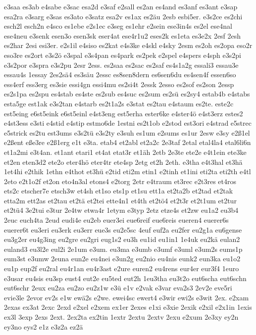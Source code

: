 {e3saa
es3ab
e4sabe
e3sac
esa2d
e3saf
e2sall
es2an
es4and
es3anf
es3ant
e3sap
esa2ra
e3sarg
e3sas
es3ato
e3satz
esa2v
es1ax
es2äu
2esb
esbi5er.
e3s2ce
es2chi
esch2l
esch2n
e4sco
es1ebe
e2s1ec
e3seg
es1ehr
e2sein
ese3in4s
es2el
ese4nal
ese4neu
e3senk
esen3o
esen3sk
eser4at
ese4r1u2
eses2k
es1eta
es3e2x
2esf
2esh
es2har
2esi
esi3er.
e2s1il
e4siso
es2kat
e4s3ke
e4skl
e4sky
2esm
es2oh
es2opa
eso2r
eso3re
es2ort
e3s2ö
e3spal
e3s4pan
es4park
es2pek
e2spel
e4spers
e4sph
e3s2pi
e3s2por
e3spra
e3s2pu
2esr
2ess.
es2saa
es2sac
es2saf
es4s1a2g
essali3
essau3e
essau4s
1essay
2es2sä4
es3säu
2essc
es8sen8dern
es6sen6du
es4sen4f
essen6so
ess4erf
ess3erg
es3sie
essi4gn
essi4mu
es2si4t
2essk
2esso
es2sof
es2son
2essp
es2s1pa
es2spu
es4stab
es4ste
es2sub
es4suc
es2sum
es2sü
es2sy4
estab4b
e4stabs
esta5ge
est1ak
e3s2tan
e4starb
es2t1a2s
e3stat
es2tau
e4staum
es2te.
este2c
est5eing
e6st5eink
e6st5einl
e4st3eng
est5erha
ester6ke
e4ster4ö
e4st3erz
estes2
e4st3ess
e3sti
e4stid
e4stip
estmo6de
1estni
es2t1ob
e2stod
est3ori
e4strad
e5strec
e5strick
es2tu
est3ums
e3s2tü
e3s2ty
e3suh
es1um
e2sums
es1ur
2esw
e3sy
e2ß1el
e2ßent
eße3re
e2ß1erg
e1t
e3ta.
etab4
et2abl
et2a2c
2e3taf
2etal
etal4la4
etal6li6n
et1a2mi
e3t4an.
et1ant
etari1
et4at
etat3r
et1äh
2etb
2e3te
ete2e
e4t1ein
ete3ke
et2en
eten3d2
ete2o
eter4hö
eter4tr
ete4sp
2etg
et2h
2eth.
e3tha
e4t3hal
et3hä
1et4hi
e2thik
1ethn
e4thot
et3hü
e2tid
eti2m
etin1
e2tinh
et1ini
eti2ta
eti2th
e4tl
2eto
e2t1o2f
et2on
eto4n3al
etons4
e2torg
2etr
e4traum
et3rec
e2t3res
et4ros
ets2c
etscher7e
etsch3w
et4sh
et1so
ets1p
et1su
ett1a
et2ta2b
et2tad
et2tak
etta2m
ett2as
et2tau
et2tä
et2tei
ette4n1
et4th
et2tö4
et2t3r
et2t1um
et2tur
et2tü4
3e2tui
e3tur
2e4tw
etwa4r
1etym
e3typ
2etz
etze4s
et2zw
eu1a2
eu3b4
2euc
euch4ta
2eud
eudi4e
eu2eb
euer3ei
eue6reif
eue6reis
eueren4
euerer6s
euerer6t
eu3eri
eu3erk
eu3err
eue3s
eu2e5sc
4euf
euf2a
eu2fer
eu2g1a
eu6gense
eu3g2er
eu4g3ing
eu2gre
eu2gri
eug1s2
eu3h
eu1id
eu1in1
1e4uk
eu2kä
eulan2
euland3
eu3l2e
eul2i
2e1um
e3um.
eu3ma
e3umb
e3umf
e3uml
e3um2s
eums1p
eum3st
e3umw
2euna
eun2e
eu4nei
e3un2g
eu2nio
eu4nis
eunk2
eun3ka
eu1o2
eu1p
eup2f
eu2ral
eu4r1an
eu4r3ast
e2ure
euren2
eu4rens
eur4er
eur3f4
1euro
e3usar
eu4sis
eu3sp
eust4
eut2e
eu5ted
eut2h
1eu3tha
eu3t2o
eut6scha
eut6schn
eut6schr
2eux
eu2za
eu2zo
eu2z1w
e3ü
e1v
e2vak
e3var
eva2s3
2ev2e
eve5ri
evie3le
2evor
ev2s
e1w
ewä2s
e2we.
ewei4sc
ewert4
e3wir
ewi2s
e3wit
2ex.
e2xam
2exas
ex3at
2exc
2exd
e2xel
e2xem
ex1er
2exes
e1xi
e3xie
2exik
e2xil
e2x1in
1exis
ex3l
3exp
2exs
2ext.
2ex2ta
ex2tin
1extr
2extu
2extv
2exu
e2xum
2e3xy
ey2n
ey3no
eys2
e1z
e3z2a
ez2ä
}
